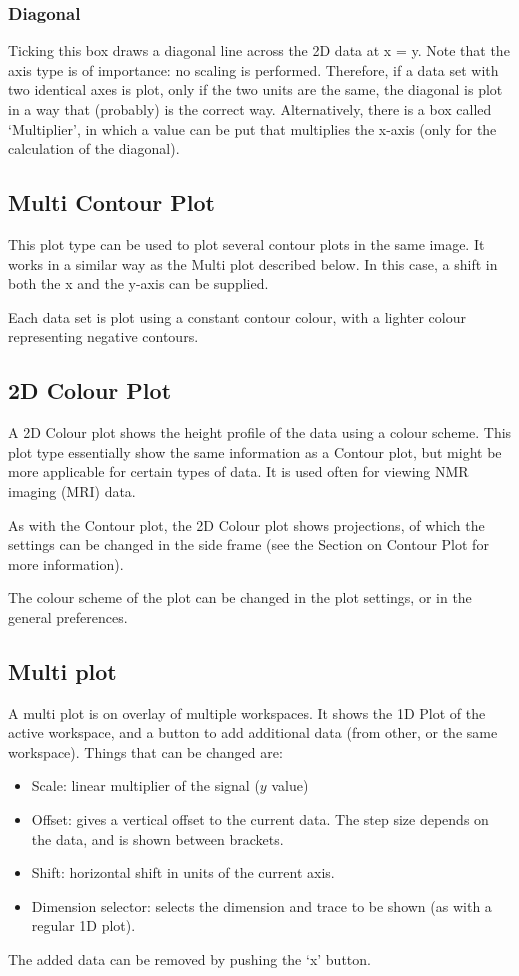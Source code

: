 \documentclass[11pt,a4paper]{article}
\begin{document}
\subsubsection*{Diagonal}
Ticking this box draws a diagonal line across the 2D data at x = y. Note that the axis type is of importance: no scaling is performed.
Therefore, if a data set with two identical axes is plot, only if the two units are the same, the diagonal is plot in a way that (probably) is the correct way.
Alternatively, there is a box called `Multiplier', in which a value can be put that multiplies the x-axis (only for the calculation of the diagonal).

\subsection{Multi Contour Plot}
This plot type can be used to plot several contour plots in the same image. It works in a similar way as the Multi plot described below. In this case, a shift in both the x and the y-axis can be supplied.

Each data set is plot using a constant contour colour, with a lighter colour representing negative contours.

\subsection{2D Colour Plot}
A 2D Colour plot shows the height profile of the data using a colour scheme.
This plot type essentially show the same information as a Contour plot, but might
be more applicable for certain types of data. It is used often for viewing NMR imaging (MRI) data.

As with the Contour plot, the 2D Colour plot shows projections, of which the settings can be changed in the side frame (see the Section on Contour Plot for more information).

The colour scheme of the plot can be changed in the plot settings, or in the general preferences.

\subsection{Multi plot}
A multi plot is on overlay of multiple workspaces. It shows the 1D Plot of the active workspace, and a button
to add additional data (from other, or the same workspace). Things that can be changed are:
\begin{itemize}
  \item Scale: linear multiplier of the signal ($y$ value)
  \item Offset: gives a vertical offset to the current data. The step size depends on the data, and is shown between
	 brackets.
  \item Shift: horizontal shift in units of the current axis.
  \item Dimension selector: selects the dimension and trace to be shown (as with a regular 1D plot).
\end{itemize}
The added data can be removed by pushing the `x' button.
\end{document}
